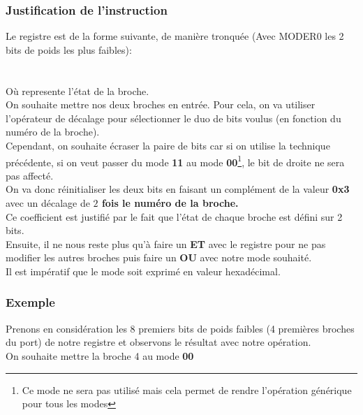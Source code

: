 \documentclass[12pt]{report}
\renewcommand{\bold}[1]{\textbf{#1}}
\begin{document}
\subsubsection{Justification de l'instruction}

Le registre  est de la forme suivante, de manière tronquée (Avec MODER0 les 2 bits de poids les plus faibles): \\
   \\
\quad\quad\quad{} \quad\quad\quad{}\quad\quad\quad{}    \quad\quad{}\\


Où  represente l'état de la broche.\\

On souhaite mettre nos deux broches en entrée. Pour cela, on va utiliser l'opérateur de décalage pour sélectionner le duo de bits voulus (en fonction du numéro de la broche). \\

Cependant, on souhaite écraser la paire de bits car si on utilise la technique précédente, si on veut passer du mode  \bold{11} au mode \bold{00}\footnote{Ce mode ne sera pas utilisé mais cela permet de rendre l'opération générique pour tous les modes}, le bit de droite ne sera pas affecté.\\

On va donc réinitialiser les deux bits en faisant un complément de la valeur \bold{0x3} avec un décalage de \bold{$2$ fois le numéro de la broche.} \\


Ce coefficient est justifié par le fait que l'état de chaque broche est défini sur 2 bits. \\

Ensuite, il ne nous reste plus qu'à faire un \bold{ET} avec le registre pour ne pas modifier les autres broches puis faire un \bold{OU} avec notre mode souhaité. \\
Il est impératif que le mode soit exprimé en valeur hexadécimal.

\subsubsection{Exemple}
Prenons en considération les 8 premiers bits de poids faibles (4 premières broches du port) de notre registre  et observons le résultat avec notre opération.\\
On souhaite mettre la broche 4 au mode \bold{00} \\
\end{document}
